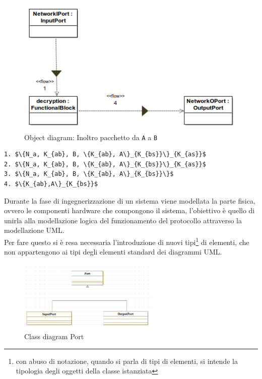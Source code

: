 \begin{figure}[h!]
    \centering 
    \includegraphics[scale=0.6]{../img/FirstMessage_2.png} 
    \caption{Object diagram: Inoltro pacchetto da \texttt{A} a \texttt{B}} 
    \label{fig:od}
\end{figure}

\begin{lstlisting}[frame=single, mathescape, basicstyle=\footnotesize]
1. $\{N_a, K_{ab}, B, \{K_{ab}, A\}_{K_{bs}}\}_{K_{as}}$
2. $\{N_a, K_{ab}, B, \{K_{ab}, A\}_{K_{bs}}\}_{K_{as}}$
3. $\{N_a, K_{ab}, B, \{K_{ab}, A\}_{K_{bs}}\}$
4. $\{K_{ab},A\}_{K_{bs}}$
\end{lstlisting}

\noindent Durante la fase di ingegnerizzazione di un sistema viene modellata la parte fisica, ovvero le componenti hardware che compongono il sistema, l'obiettivo è quello di unirla alla modellazione logica del funzionamento del protocollo attraverso la modellazione UML.\\
Per fare questo si è resa necessaria l'introduzione di nuovi tipi\footnote{con abuso di notazione, quando si parla di tipi di elementi, si intende la tipologia degli oggetti della classe istanziata} di elementi, che non appartengono ai tipi degli elementi standard dei diagrammi UML.\\
\begin{figure}[h!]
    \centering
    \includegraphics[width=0.6\textwidth]{../img/cdport.png} 
    \caption{Class diagram Port}
    \label{fig:cdport}
\end{figure}

